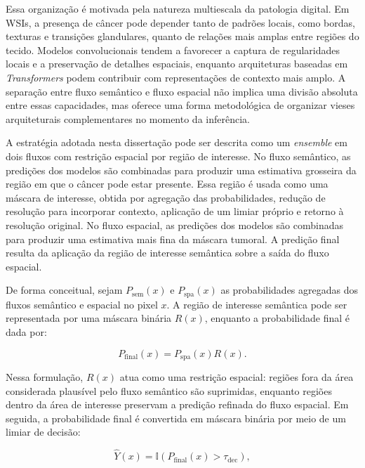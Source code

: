 Essa organização é motivada pela natureza multiescala da patologia digital. Em
WSIs, a presença de câncer pode depender tanto de padrões locais, como bordas,
texturas e transições glandulares, quanto de relações mais amplas entre regiões
do tecido. Modelos convolucionais tendem a favorecer a captura de regularidades
locais e a preservação de detalhes espaciais, enquanto arquiteturas baseadas em
\textit{Transformers} podem contribuir com representações de contexto mais
amplo. A separação entre fluxo semântico e fluxo espacial não implica uma divisão
absoluta entre essas capacidades, mas oferece uma forma metodológica de organizar
vieses arquiteturais complementares no momento da inferência.

A estratégia adotada nesta dissertação pode ser descrita como um
\textit{ensemble} em dois fluxos com restrição espacial por região de interesse.
No fluxo semântico, as predições dos modelos são combinadas para produzir uma
estimativa grosseira da região em que o câncer pode estar presente. Essa região
é usada como uma máscara de interesse, obtida por agregação das probabilidades,
redução de resolução para incorporar contexto, aplicação de um limiar próprio e
retorno à resolução original. No fluxo espacial, as predições dos modelos são
combinadas para produzir uma estimativa mais fina da máscara tumoral. A predição
final resulta da aplicação da região de interesse semântica sobre a saída do
fluxo espacial.

De forma conceitual, sejam $P_{\mathrm{sem}}(x)$ e $P_{\mathrm{spa}}(x)$ as
probabilidades agregadas dos fluxos semântico e espacial no pixel $x$. A região
de interesse semântica pode ser representada por uma máscara binária
$R(x)$, enquanto a probabilidade final é dada por:

\begin{equation}\label{eq:two-stream-gated-ensemble}
    P_{\mathrm{final}}(x)
    =
    P_{\mathrm{spa}}(x)R(x).
\end{equation}

Nessa formulação, $R(x)$ atua como uma restrição espacial: regiões fora da área
considerada plausível pelo fluxo semântico são suprimidas, enquanto regiões
dentro da área de interesse preservam a predição refinada do fluxo espacial. Em
seguida, a probabilidade final é convertida em máscara binária por meio de um
limiar de decisão:

\begin{equation}\label{eq:ensemble-decision-threshold}
    \hat{Y}(x)
    =
    \mathbb{I}\left(P_{\mathrm{final}}(x)>\tau_{\mathrm{dec}}\right),
\end{equation}


